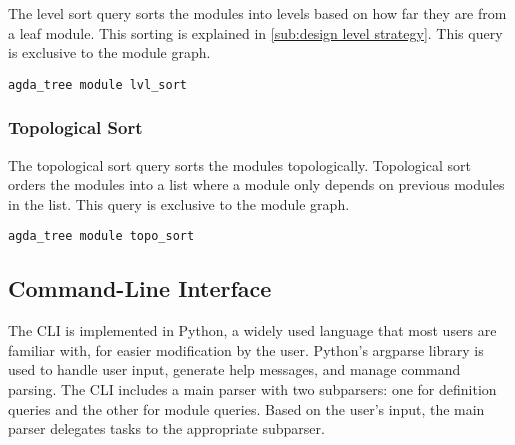 The level sort query sorts the modules into levels based on how far they are
from a leaf module. This sorting is explained in \cref{sub:design level
strategy}. This query is exclusive to the module graph. 

\begin{lstlisting}
agda_tree module lvl_sort
\end{lstlisting}

\subsubsection{Topological Sort}

The topological sort query sorts the modules topologically. Topological sort
orders the modules into a list where a module only depends on previous modules
in the list. This query is exclusive to the module graph. 

\begin{lstlisting}
agda_tree module topo_sort
\end{lstlisting}


\subsection{Command-Line Interface}\label{sub:Agda Tree CLI}

The CLI is implemented in Python, a widely used language that most users are
familiar with, for easier modification by the user. Python's
argparse library is used to handle user input, generate help messages, and
manage command parsing. The CLI includes a main parser with two subparsers: one
for definition queries and the other for module queries. Based on the user’s
input, the main parser delegates tasks to the appropriate subparser.

